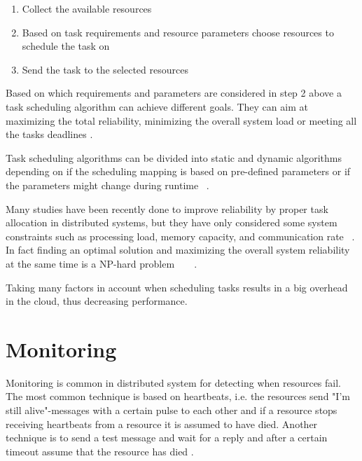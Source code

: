 \documentclass{cslthse-msc}
\begin{document}
\begin{enumerate}
	\item Collect the available resources
	\item Based on task requirements and resource parameters choose resources to schedule the task on
	\item Send the task to the selected resources
\end{enumerate}

Based on which requirements and parameters are considered in step 2 above a task scheduling algorithm can achieve different goals. They can aim at maximizing the total reliability, minimizing the overall system load or meeting all the tasks deadlines \cite{schedulingSurvey}. 

Task scheduling algorithms can be divided into static and dynamic algorithms depending on if the scheduling mapping is based on pre-defined parameters or if the parameters might change during runtime ~\cite{schedReplicas}.

Many studies have been recently done to improve reliability by proper task allocation in distributed systems, but they have only considered some system constraints such as processing load, memory capacity, and communication rate ~\cite{optTaskAllocationForMaxRel}. In fact finding an optimal solution and maximizing the overall system reliability at the same time is a NP-hard problem ~\cite{optTaskAllocationForMaxRel} ~\cite{taskAllocationSwarm} \cite{schedulingSurvey}.

Taking many factors in account when scheduling tasks results in a big overhead in the cloud, thus decreasing performance. 


\section{Monitoring} \label{sec:background_monitoring}
Monitoring is common in distributed system for detecting when resources fail. The most common technique is based on heartbeats, i.e. the resources send "I'm still alive"-messages with a certain pulse to each other and if a resource stops receiving heartbeats from a resource it is assumed to have died. Another technique is to send a test message and wait for a reply and after a certain timeout assume that the resource has died \cite{probabilistic_recovery}.
\end{document}
